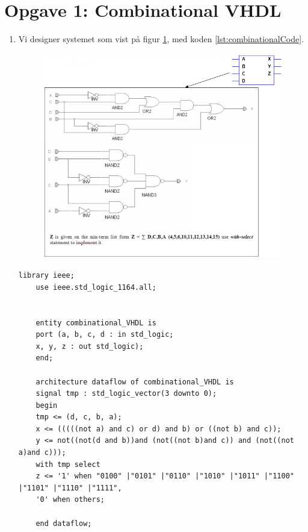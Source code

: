 \section{Opgave 1: Combinational VHDL}
\begin{enumerate}
	\item[1)]
	Vi designer systemet som vist på figur \ref{fig:figur1}, med koden \ref{lst:combinationalCode}.
	\begin{figure}[h]
		\centering
		\includegraphics[scale=0.8]{pictures/Oevelse4/figur1.JPG}
		\caption{}
		\label{fig:figur1}
	\end{figure}
	\begin{lstlisting}[caption={Combinational VHDL kode},label={lst:combinationalCode}]
	library ieee;
	use ieee.std_logic_1164.all;
	
	
	entity combinational_VHDL is
	port (a, b, c, d : in std_logic;
	x, y, z : out std_logic);
	end;
	
	architecture dataflow of combinational_VHDL is
	signal tmp : std_logic_vector(3 downto 0);
	begin
	tmp <= (d, c, b, a);
	x <= (((((not a) and c) or d) and b) or ((not b) and c));
	y <= not((not(d and b))and (not((not b)and c)) and (not((not a)and c)));
	with tmp select
	z <= '1' when "0100" |"0101" |"0110" |"1010" |"1011" |"1100" |"1101" |"1110" |"1111",
	'0' when others; 
	
	end dataflow;
	\end{lstlisting}
	

\end{enumerate}
